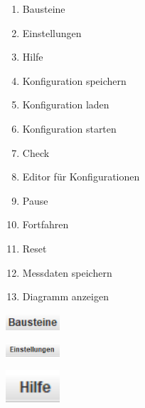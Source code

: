 \documentclass[parskip=full]{scrartcl}
\begin{document}
\begin{enumerate}
    \item Bausteine
    
    \item Einstellungen
    
    \item Hilfe
    
    \item Konfiguration speichern
    
    \item Konfiguration laden
    
    \item Konfiguration starten
    
    \item Check
    
    \item Editor für Konfigurationen
    
    \item Pause
    
    \item Fortfahren
    
    \item Reset
    
    \item Messdaten speichern
    
    \item Diagramm anzeigen
\end{enumerate}

\begin{flushleft}
    \includegraphics[width = 2cm]{Grafiken/1-Bausteine.png}
\end{flushleft}

\begin{flushleft}
    \includegraphics[width = 2cm]{Grafiken/2-Einstellungen.png}
\end{flushleft}

\begin{flushleft}
    \includegraphics[width = 2cm]{Grafiken/3-Hilfe.png}
\end{flushleft}
\end{document}
